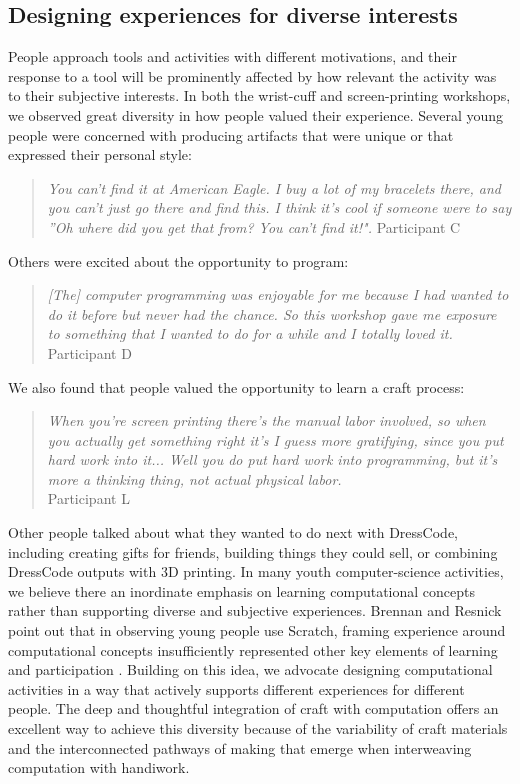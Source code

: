\documentclass{sigchi}
\begin{document}
\subsection{Designing experiences for diverse interests}
People approach tools and activities with different motivations, and their response to a tool will be prominently affected by how relevant the activity was to their subjective interests. In both the wrist-cuff and screen-printing workshops, we observed great diversity in how people valued their experience. Several young people were concerned with producing artifacts that were unique or that expressed their personal style:
\begin{quote}
\textit{You can't find it at American Eagle. I buy a lot of my bracelets there, and you can't just go there and find this. I think it's cool if someone were to say ''Oh where did you get that from? You can't find it!".}
Participant C
\end{quote}
Others were excited about the opportunity to program:
\begin{quote}
\textit{[The] computer programming was enjoyable for me because I had wanted to do it before but never had the chance. So this workshop gave me exposure to something that I wanted to do for a while and I totally loved it.}
\\Participant D
\end{quote}
We also found that people valued the opportunity to learn a craft process:
\begin{quote}
\textit{When you're screen printing there's the manual labor involved, so when you actually get something right it's I guess more gratifying, since you put hard work into it... Well you do put hard work into programming, but it's more a thinking thing, not actual physical labor.}
\\Participant L
\end{quote}
Other people talked about what they wanted to do next with DressCode, including creating gifts for friends, building things they could sell, or combining DressCode outputs with 3D printing. In many youth computer-science activities, we believe there an inordinate emphasis on learning computational concepts rather than supporting diverse and subjective experiences. Brennan and Resnick point out that in observing young people use Scratch, framing experience around computational concepts insufficiently represented other key elements of learning and participation \cite{computational_thinking}. Building on this idea, we advocate designing computational activities in a way that actively supports different experiences for different people. The deep and thoughtful integration of craft with computation offers an excellent way to achieve this diversity because of the variability of craft materials and the interconnected pathways of making that emerge when interweaving computation with handiwork. 
\end{document}
